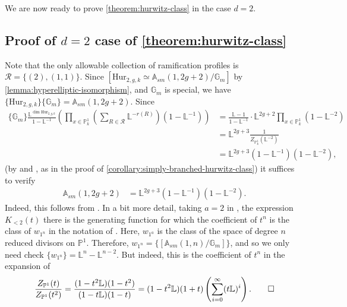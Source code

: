 \documentclass[12 pt]{amsart}
\theoremstyle{plain}
\theoremstyle{definition}
\theoremstyle{remark}
\numberwithin{equation}{section}
\newcommand\ba{\mathbb A}
\newcommand\bg{\mathbb G}
\newcommand\bl{\mathbb L}
\newcommand\bp{\mathbb P}
\newcommand\hur[3]{\mathrm{Hur}_{#1,#2,#3}} %
\newcommand\sm{sm}
\begin{document}
We are now ready to prove \autoref{theorem:hurwitz-class} in the case $d = 2$.
\subsection{Proof of $d=2$ case of \autoref{theorem:hurwitz-class}}
\label{subsection:d=2-proof}

Note that the only
	allowable collection of ramification profiles
	is $\mathcal R = \{ (2), (1,1)\}$.  Since
$[\hur 2 g k \simeq \ba_{\sm}(1,2g+2)/\bg_m]$ by
	\autoref{lemma:hyperelliptic-isomorphism}, and $\bg_m$ is special, we
	have $\{\hur 2 g k\}\{\bg_m\} = \ba_{\sm}(1,2g+2)$.  Since \begin{align*}
		\{\bg_m\} \frac{\bl^{\dim{\hur 2 g k}}}{1-\bl^{-1}} \left(
		\prod_{x \in \bp^1_k} \left( \sum_{R \in \mathcal R} \bl^{-r(R)}
	\right) \left( 1-\bl^{-1} \right) \right) &= \frac{\bl-1}{1-\bl^{-1}}
	\cdot \bl^{2g+2} \prod_{x \in \bp^1_k} \left( 1-\bl^{-2} \right) \\ &=
\bl^{2g+3} \frac{1}{Z_{\bp^1_k}(\bl^{-2})} \\ &= \bl^{2g+3} \left( 1-\bl^{-1}
\right)\left( 1-\bl^{-2} \right), \end{align*} 
	(by \cite[Ex.\ 6.1.12]{biluH:motivic-euler-products-in-motivic-statistics}
	and \cite[\S3.8, Property 4]{bilu:thesis}, as in the proof of
\autoref{corollary:simply-branched-hurwitz-class})
it suffices to verify
\begin{align*} \ba_{\sm}(1,2g+2)&= \bl^{2g+3} \left( 1-\bl^{-1} \right)\left(
	1-\bl^{-2} \right).  \end{align*} 
	Indeed, this follows from \cite[Lem.\
	5.9(a)]{Vakil2015}.  In a bit more detail, taking $a =2$ in \cite[Lem.\
	5.9(a)]{Vakil2015}, the expression $K_{<2}(t)$ there is the generating
	function for which the coefficient of $t^n$ is the class of $w_{1^n}$ in
	the notation of \cite[(5.1)]{Vakil2015}. Here, $w_{1^a}$ is the class of
	the space of degree $n$ reduced divisors on $\bp^1$. Therefore, $w_{1^n}
= \{[\ba_{\sm}(1, n)/\bg_m]\}$, and so we only need check $\{w_{1^n}\} = \bl^n
	- \bl^{n-2}$. But indeed, this is the coefficient of $t^n$ in the
	expansion of \begin{equation*} \frac{Z_{\bp^1}(t)}{Z_{\bp^1}(t^2)} =
		\frac{(1-t^2 \bl)(1-t^2)}{(1-t\bl)(1-t)} = (1-t^2
		\bl)(1+t)\left(\sum_{i=0}^\infty (t\bl)^i\right).\qedhere
\end{equation*} 
\end{document}

